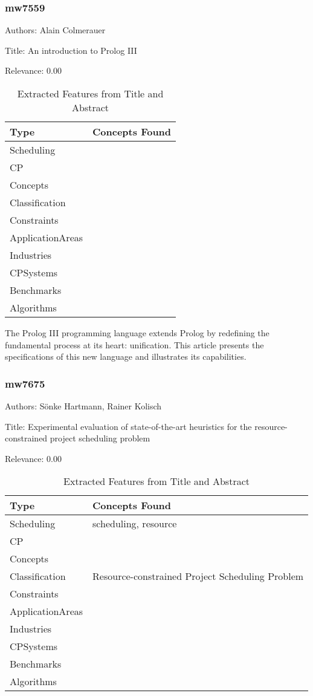 \subsubsection{mw7559}
\label{mw:mw7559}

Authors: Alain Colmerauer

Title: An introduction to Prolog III

Relevance:  0.00

{\scriptsize
\begin{longtable}{p{2cm}p{20cm}}
\caption{Extracted Features from Title and Abstract}\\ \toprule
Type & Concepts Found\\ \midrule
\endhead
\bottomrule
\endfoot
Scheduling & \\ 
CP & \\ 
Concepts & \\ 
Classification & \\ 
Constraints & \\ 
ApplicationAreas & \\ 
Industries & \\ 
CPSystems & \\ 
Benchmarks & \\ 
Algorithms & \\ 
\end{longtable}
}

 The Prolog III programming language extends Prolog by redefining the fundamental process at its heart: unification. This article presents the specifications of this new language and illustrates its capabilities. 

\subsubsection{mw7675}
\label{mw:mw7675}

Authors: Sönke Hartmann, Rainer Kolisch

Title: Experimental evaluation of state-of-the-art heuristics for the resource-constrained project scheduling problem

Relevance:  0.00

{\scriptsize
\begin{longtable}{p{2cm}p{20cm}}
\caption{Extracted Features from Title and Abstract}\\ \toprule
Type & Concepts Found\\ \midrule
\endhead
\bottomrule
\endfoot
Scheduling & scheduling, resource\\ 
CP & \\ 
Concepts & \\ 
Classification & Resource-constrained Project Scheduling Problem\\ 
Constraints & \\ 
ApplicationAreas & \\ 
Industries & \\ 
CPSystems & \\ 
Benchmarks & \\ 
Algorithms & \\ 
\end{longtable}
}



